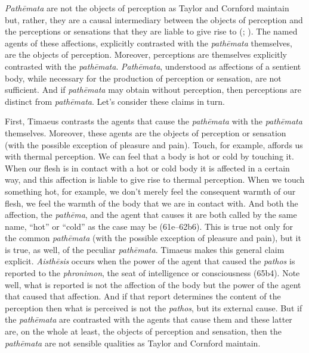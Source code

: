 \emph{Pathēmata} are not the objects of perception as Taylor and Cornford maintain but, rather, they are a causal intermediary between the objects of perception and the perceptions or sensations that they are liable to give rise to (\citealt[138]{OBrien:1984ji}; \citealt{Brisson:1997qr}). The named agents of these affections, explicitly contrasted with the \emph{pathēmata} themselves, are the objects of perception. Moreover, perceptions are themselves explicitly contrasted with the \emph{pathēmata}. \emph{Pathēmata}, understood as affections of a sentient body, while necessary for the production of perception or sensation, are not sufficient. And if \emph{pathēmata} may obtain without perception, then perceptions are distinct from \emph{pathēmata}. Let's consider these claims in turn.

First, Timaeus contrasts the agents that cause the \emph{pathēmata} with the \emph{pathēmata} themselves. Moreover, these agents are the objects of perception or sensation (with the possible exception of pleasure and pain). Touch, for example, affords us with thermal perception. We can feel that a body is hot or cold by touching it. When our flesh is in contact with a hot or cold body it is affected in a certain way, and this affection is liable to give rise to thermal perception. When we touch something hot, for example, we don't merely feel the consequent warmth of our flesh, we feel the warmth of the body that we are in contact with. And both the affection, the \emph{pathēma}, and the agent that causes it are both called by the same name, ``hot'' or ``cold'' as the case may be (61e--62b6). This is true not only for the common \emph{pathēmata} (with the possible exception of pleasure and pain), but it is true, as well, of the peculiar \emph{pathēmata}. Timaeus makes this general claim explicit. \emph{Aisthēsis} occurs when the power of the agent that caused the \emph{pathos} is reported to the \emph{phronimon}, the seat of intelligence or consciousness (65b4). Note well, what is reported is not the affection of the body but the power of the agent that caused that affection. And if that report determines the content of the perception then what is perceived is not the \emph{pathos}, but its external cause. But if the \emph{pathēmata} are contrasted with the agents that cause them and these latter are, on the whole at least, the objects of perception and sensation, then the \emph{pathēmata} are not sensible qualities as Taylor and Cornford maintain.

